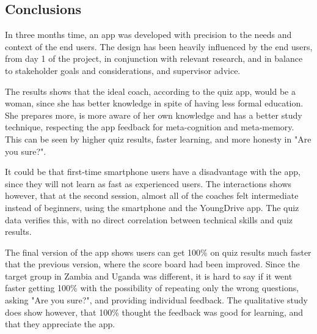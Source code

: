 \subsection{Conclusions}


In three months time, an app was developed with precision to the needs and context of the end users. The design has been heavily influenced by the end users, from day 1 of the project, in conjunction with relevant research, and in balance to stakeholder goals and considerations, and supervisor advice.

The results shows that the ideal coach, according to the quiz app, would be a woman, since she has better knowledge in spite of having less formal education. She prepares more, is more aware of her own knowledge and has a better study technique, respecting the app feedback for meta-cognition and meta-memory. This can be seen by higher quiz results, faster learning, and more honesty in "Are you sure?".

It could be that first-time smartphone users have a disadvantage with the app, since they will not learn as fast as experienced users. The interactions shows however, that at the second session, almost all of the coaches felt intermediate instead of beginners, using the smartphone and the YoungDrive app. The quiz data verifies this, with no direct correlation between technical skills and quiz results.

The final version of the app shows users can get 100\% on quiz results much faster that the previous version, where the score board had been improved. Since the target group in Zambia and Uganda was different, it is hard to say if it went faster getting 100\% with the possibility of repeating only the wrong questions, asking "Are you sure?", and providing individual feedback. The qualitative study does show however, that 100\% thought the feedback was good for learning, and that they appreciate the app.
